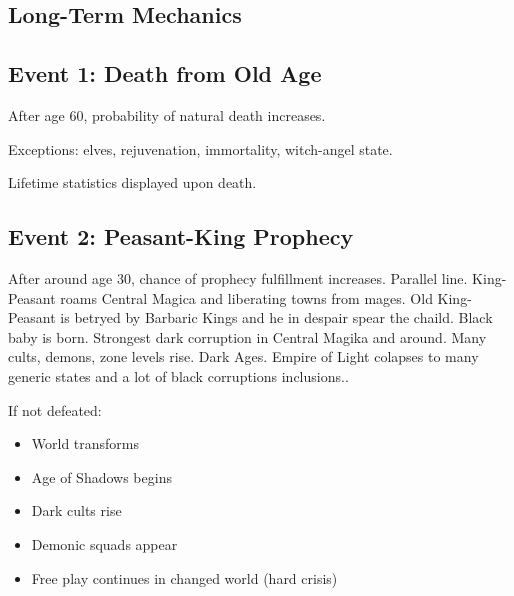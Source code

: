\documentclass[a4paper,12pt]{article}
\begin{document}
\subsection{Long-Term Mechanics}

\subsection{Event 1: Death from Old Age}

After age 60, probability of natural death increases.

Exceptions: elves, rejuvenation, immortality, witch-angel state.

Lifetime statistics displayed upon death.



\subsection{Event 2: Peasant-King Prophecy}

After around age 30, chance of prophecy fulfillment increases.
Parallel line. King-Peasant roams Central Magica and liberating towns from mages. Old King-Peasant is betryed by Barbaric Kings and he in despair spear the chaild. Black baby is born. Strongest dark corruption in Central Magika and around. Many cults, demons, zone levels rise. Dark Ages. Empire of Light colapses to many generic states and a lot of black corruptions inclusions..

If not defeated:

\begin{itemize}
\item World transforms
\item Age of Shadows begins
\item Dark cults rise
\item Demonic squads appear
\item Free play continues in changed world (hard crisis)
\end{itemize}
\end{document}
